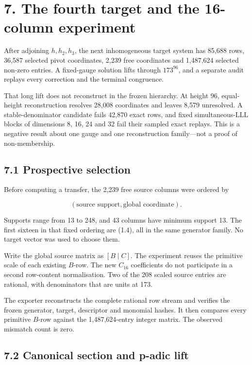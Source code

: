 \documentclass[
  11pt,
]{article}
\begin{document}
\section{7. The fourth target and the 16-column
experiment}\label{the-fourth-target-and-the-16-column-experiment}

After adjoining \(h,h_2,h_3\), the next inhomogeneous target system has
85,688 rows, 36,587 selected pivot coordinates, 2,239 free coordinates
and 1,487,624 selected non-zero entries. A fixed-gauge solution lifts
through \(173^{96}\), and a separate audit replays every correction and
the terminal congruence.

That long lift does not reconstruct in the frozen hierarchy. At height
96, equal-height reconstruction resolves 28,008 coordinates and leaves
8,579 unresolved. A stable-denominator candidate fails 42,870 exact
rows, and fixed simultaneous-LLL blocks of dimensions 8, 16, 24 and 32
fail their sampled exact replays. This is a negative result about one
gauge and one reconstruction family---not a proof of non-membership.

\subsection{7.1 Prospective selection}\label{prospective-selection}

Before computing a transfer, the 2,239 free source columns were ordered
by

\[
(\text{source support},\text{global coordinate}).
\]

Supports range from 13 to 248, and 43 columns have minimum support 13.
The first sixteen in that fixed ordering are (1.4), all in the same
generator family. No target vector was used to choose them.

Write the global source matrix as \([B\mid C]\). The experiment reuses
the primitive scale of each existing \(B\)-row. The new \(C_{16}\)
coefficients do not participate in a second row-content normalisation.
Two of the 208 scaled source entries are rational, with denominators
that are units at 173.

The exporter reconstructs the complete rational row stream and verifies
the frozen generator, target, descriptor and monomial hashes. It then
compares every primitive \(B\)-row against the 1,487,624-entry integer
matrix. The observed mismatch count is zero.

\subsection{7.2 Canonical section and p-adic
lift}\label{canonical-section-and-p-adic-lift}
\end{document}
